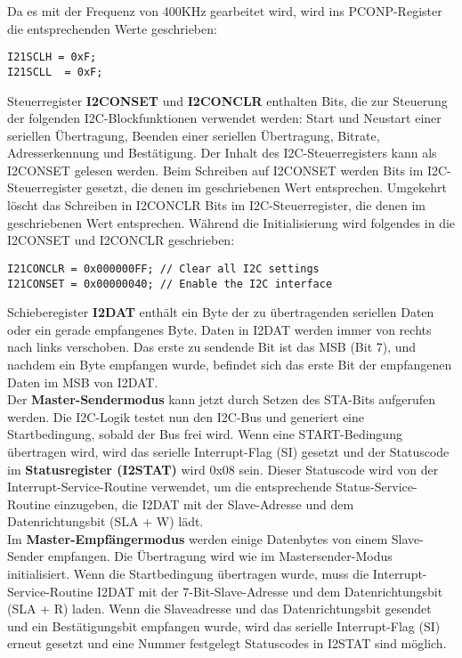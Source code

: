 Da es mit der Frequenz von 400KHz gearbeitet wird, wird ins PCONP-Register die entsprechenden Werte geschrieben:
\begin{lstlisting}
I21SCLH = 0xF;
I21SCLL  = 0xF;
\end{lstlisting}

Steuerregister \textbf{I2CONSET} und \textbf{I2CONCLR} enthalten Bits, die zur Steuerung der folgenden I2C-Blockfunktionen verwendet werden: Start und Neustart einer seriellen Übertragung, Beenden einer seriellen Übertragung, Bitrate, Adresserkennung und Bestätigung. Der Inhalt des I2C-Steuerregisters kann als I2CONSET gelesen werden. Beim Schreiben auf I2CONSET werden Bits im I2C-Steuerregister gesetzt, die denen im geschriebenen Wert entsprechen. Umgekehrt löscht das Schreiben in I2CONCLR Bits im I2C-Steuerregister, die denen im geschriebenen Wert entsprechen. Während die Initialisierung wird folgendes in die I2CONSET und I2CONCLR geschrieben: \\

\begin{lstlisting}
I21CONCLR = 0x000000FF; // Clear all I2C settings
I21CONSET = 0x00000040; // Enable the I2C interface
\end{lstlisting}

Schieberegister \textbf{I2DAT} enthält ein Byte der zu übertragenden seriellen Daten oder ein gerade empfangenes Byte. Daten in I2DAT werden immer von rechts nach links verschoben. Das erste zu sendende Bit ist das MSB (Bit 7), und nachdem ein Byte empfangen wurde, befindet sich das erste Bit der empfangenen Daten im MSB von I2DAT. \\

Der \textbf{Master-Sendermodus} kann jetzt durch Setzen des STA-Bits aufgerufen werden. Die I2C-Logik testet nun den I2C-Bus und generiert eine Startbedingung, sobald der Bus frei wird. Wenn eine START-Bedingung übertragen wird, wird das serielle Interrupt-Flag (SI) gesetzt und der Statuscode im \textbf{Statusregister (I2STAT)} wird 0x08 sein. Dieser Statuscode wird von der Interrupt-Service-Routine verwendet, um die entsprechende Status-Service-Routine einzugeben, die I2DAT mit der Slave-Adresse und dem Datenrichtungsbit (SLA + W) lädt.\\

Im \textbf{Master-Empfängermodus} werden einige Datenbytes von einem Slave-Sender empfangen. Die Übertragung wird wie im Mastersender-Modus initialisiert. Wenn die Startbedingung übertragen wurde, muss die Interrupt-Service-Routine I2DAT mit der 7-Bit-Slave-Adresse und dem Datenrichtungsbit (SLA + R) laden. Wenn die Slaveadresse und das Datenrichtungsbit gesendet und ein Bestätigungsbit empfangen wurde, wird das serielle Interrupt-Flag (SI) erneut gesetzt und eine Nummer festgelegt Statuscodes in I2STAT sind möglich. 


